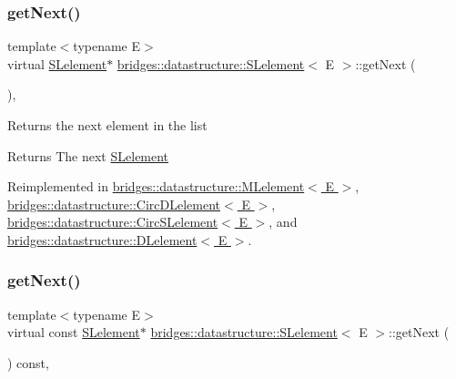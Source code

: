 \subsubsection{\texorpdfstring{get\+Next()}{getNext()}\hspace{0.1cm}{\footnotesize\ttfamily [1/2]}}
{\footnotesize\ttfamily template$<$typename E$>$ \\
virtual \hyperlink{classbridges_1_1datastructure_1_1_s_lelement}{S\+Lelement}$\ast$ \hyperlink{classbridges_1_1datastructure_1_1_s_lelement}{bridges\+::datastructure\+::\+S\+Lelement}$<$ E $>$\+::get\+Next (\begin{DoxyParamCaption}{ }\end{DoxyParamCaption})\hspace{0.3cm}{\ttfamily [inline]}, {\ttfamily [virtual]}}

Returns the next element in the list \begin{DoxyReturn}{Returns}
The next \hyperlink{classbridges_1_1datastructure_1_1_s_lelement}{S\+Lelement} 
\end{DoxyReturn}


Reimplemented in \hyperlink{classbridges_1_1datastructure_1_1_m_lelement_a47b417db0b948b6899eece572bef9274}{bridges\+::datastructure\+::\+M\+Lelement$<$ E $>$}, \hyperlink{classbridges_1_1datastructure_1_1_circ_d_lelement_a80681d0382643a6df21da1bec4067004}{bridges\+::datastructure\+::\+Circ\+D\+Lelement$<$ E $>$}, \hyperlink{classbridges_1_1datastructure_1_1_circ_s_lelement_aff77056ace1361a35a09dc006eba34a3}{bridges\+::datastructure\+::\+Circ\+S\+Lelement$<$ E $>$}, and \hyperlink{classbridges_1_1datastructure_1_1_d_lelement_a63212051ea77d74bd751dea00288d2be}{bridges\+::datastructure\+::\+D\+Lelement$<$ E $>$}.

\mbox{\label{classbridges_1_1datastructure_1_1_s_lelement_a8c62cb82fa64bbfe9ebb7334a5fea417}} 
\subsubsection{\texorpdfstring{get\+Next()}{getNext()}\hspace{0.1cm}{\footnotesize\ttfamily [2/2]}}
{\footnotesize\ttfamily template$<$typename E$>$ \\
virtual const \hyperlink{classbridges_1_1datastructure_1_1_s_lelement}{S\+Lelement}$\ast$ \hyperlink{classbridges_1_1datastructure_1_1_s_lelement}{bridges\+::datastructure\+::\+S\+Lelement}$<$ E $>$\+::get\+Next (\begin{DoxyParamCaption}{ }\end{DoxyParamCaption}) const\hspace{0.3cm}{\ttfamily [inline]}, {\ttfamily [virtual]}}

